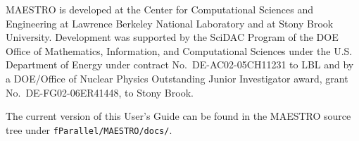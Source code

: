 MAESTRO is developed at the Center for Computational Sciences and
Engineering at Lawrence Berkeley National Laboratory and at Stony
Brook University.  Development was supported by the SciDAC Program of
the DOE Office of Mathematics, Information, and Computational Sciences
under the U.S. Department of Energy under contract
No.\ DE-AC02-05CH11231 to LBL and by a DOE/Office of Nuclear Physics
Outstanding Junior Investigator award, grant No.\ DE-FG02-06ER41448,
to Stony Brook.

The current version of this User's Guide can be found in the MAESTRO
source tree under {\tt fParallel/MAESTRO/docs/}.
